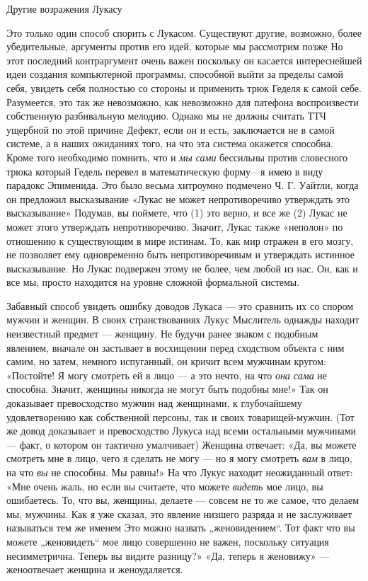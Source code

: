 Другие возражения Лукасу

Это только один способ спорить с Лукасом. Существуют другие, возможно, более убедительные, аргументы против его идей, которые мы рассмотрим позже Но этот последний контраргумент очень важен поскольку он касается интереснейшей идеи создания компьютерной программы, способной выйти за пределы самой себя, увидеть себя полностью со стороны и применить трюк Геделя к самой себе. Разумеется, это так же невозможно, как невозможно для патефона воспроизвести собственную разбивальную мелодию. Однако мы не должны считать ТТЧ ущербной по этой причине Дефект, если он и есть, заключается не в самой системе, а в наших ожиданиях того, на что эта система окажется способна. Кроме того необходимо помнить, что и \emph{мы сами} бессильны против словесного трюка который Гедель перевел в математическую форму---я имею в виду парадокс Эпименида. Это было весьма хитроумно подмечено Ч. Г. Уайтли, когда он предложил высказывание «Лукас не может непротиворечиво утверждать это высказывание» Подумав, вы поймете, что (1) это верно, и все же (2) Лукас не может этого утверждать непротиворечиво. Значит, Лукас также «неполон» по отношению к существующим в мире истинам. То, как мир отражен в его мозгу, не позволяет ему одновременно быть непротиворечивым и утверждать истинное высказывание. Но Лукас подвержен этому не более, чем любой из нас. Он, как и все мы, просто находится на уровне сложной формальной системы.

Забавный способ увидеть ошибку доводов Лукаса --- это сравнить их со спором мужчин и женщин. В своих странствованиях Лукус Мыслитель однажды находит неизвестный предмет --- женщину. Не будучи ранее знаком с подобным явлением, вначале он застывает в восхищении перед сходством объекта с ним самим, но затем, немного испуганный, он кричит всем мужчинам кругом: «Постойте! Я могу смотреть ей в лицо --- а это нечто, на что \emph{она сама} не способна. Значит, женщины никогда не могут быть подобны мне!» Так он доказывает превосходство мужчин над женщинами, к глубочайшему удовлетворению как собственной персоны, так и своих товарищей-мужчин. (Тот же довод доказывает и превосходство Лукуса над всеми остальными мужчинами --- факт, о котором он тактично умалчивает) Женщина отвечает: «Да, вы можете смотреть мне в лицо, чего я сделать не могу --- но я могу смотреть \emph{вам} в лицо, на что \emph{вы} не способны. Мы равны!» На что Лукус находит неожиданный ответ: «Мне очень жаль, но если вы считаете, что можете \emph{видеть} мое лицо, вы ошибаетесь. То, что вы, женщины, делаете --- совсем не то же самое, что делаем мы, мужчины. Как я уже сказал, это явление низшего разряда и не заслуживает называться тем же именем Это можно назвать „женовидением``. Тот факт что вы можете „женовидеть`` мое лицо совершенно не важен, поскольку ситуация несимметрична. Теперь вы видите разницу?» «Да, теперь я женовижу» --- женоотвечает женщина и женоудаляется.

